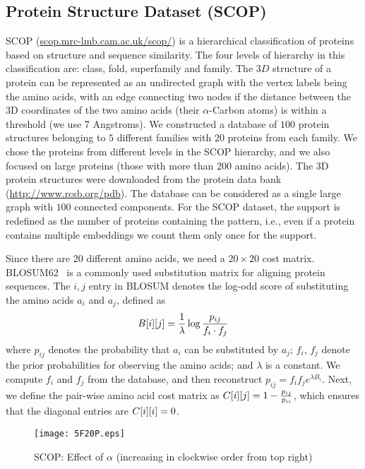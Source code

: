 \subsection{Protein Structure Dataset (SCOP)}
SCOP (\url{scop.mrc-lmb.cam.ac.uk/scop/}) 
is a hierarchical classification of proteins based on structure
and sequence similarity. The four levels of hierarchy in this
classification are: class, fold, superfamily and family.  The $3D$
structure of a protein can be represented as an undirected graph with
the vertex labels being the amino acids, with an edge connecting two
nodes if the distance between the 
3D coordinates of the two amino acids (their
$\alpha$-Carbon atoms) is within a threshold (we use 7 Angstroms).
We constructed a database of
$100$ protein structures belonging to $5$ different families with $20$
proteins from each family. 
We chose the proteins from different levels in the SCOP hierarchy, and
we also focused on large proteins (those with more than 200 amino
acids). 
The 3D protein structures were downloaded from the
protein data bank (\url{http://www.rcsb.org/pdb}).  The database
can be considered as a single large graph with $100$ connected
components. 
For the SCOP dataset, the support is redefined as 
the number of proteins containing the pattern, i.e., 
even if a protein contains multiple embeddings we count them only once for the support.

\smallskip{}
Since there are 20 different amino acids, we need a $20 \times 20$ cost
matrix. BLOSUM62~\cite{HH92} is a commonly used substitution matrix for aligning protein
sequences.  The $i,j$ entry in BLOSUM denotes the log-odd score
of substituting the amino acids $a_i$ and $a_j$, defined as
\begin{equation*}
    \label{eq:blosum}
    {B}[i][j] = \frac{1}{\lambda} 
	\log\frac{p_{ij}}{f_i \cdot f_j}
\end{equation*}
where $p_{ij}$ denotes the probability that  $a_i$ can be
substituted by $a_j$; 
$f_i$, $f_j$ denote the prior probabilities for observing the 
amino acids; and $\lambda$ is a constant. We compute $f_i$ and $f_j$
from the database, and then reconstruct $p_{ij}=f_if_j e^{\lambda
B_{i}}$. Next, we define the pair-wise amino acid cost matrix as
${C}[i][j] = 1-\frac{p_{ij}}{p_{ii}}$, which ensures that
the diagonal entries are ${C}[i][i] =0$.

\begin{figure}[!ht]
	\centerline{
    \texttt{[image: 5F20P.eps]}
	}
	\caption{SCOP: Effect of $\alpha$ (increasing in 
	clockwise order from top right)}
    \label{fig:5F20P}
\end{figure}

